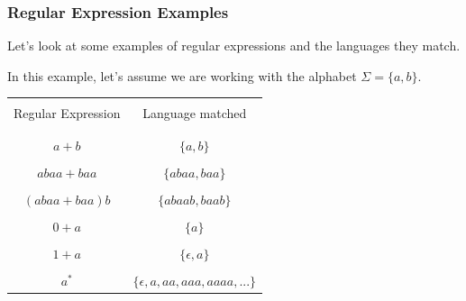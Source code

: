 \documentclass[aspectratio=169]{beamer}
\begin{document}
\begin{frame}[fragile]
  \frametitle{Regular Expression Examples}

  Let's look at some examples of regular expressions and the languages they match.

  \vspace{\fill}

  In this example, let's assume we are working with the alphabet $\Sigma = \{a, b\}$.

  \pause
  \vspace{\fill}

  \begin{center}
    \begin{tabular}{c || c}
      \hline & \\[-1.5ex]
      Regular Expression & Language matched \\ [2pt]
      \hline & \\[-2ex]
      \hline & \\[-1.5ex]
      $a + b$ & $\{a, b\}$ \\ [2pt]
      \hline & \\[-1.5ex]
      $abaa + baa$ & $\{abaa, baa\}$ \\ [2pt]
      \hline & \\[-1.5ex]
      $(abaa + baa)b$ & $\{ abaab, baab \}$ \\ [2pt]
      \hline & \\[-1.5ex]
      $0 + a$ & $\{a\}$ \\ [2pt]
      \hline & \\[-1.5ex]
      $1 + a$ & $\{ \epsilon, a \}$ \\ [2pt]
      \hline & \\[-1.5ex]
      $a^*$ & $\{ \epsilon, a, aa, aaa, aaaa, ... \}$ \\ [2pt]
      \hline
    \end{tabular}
  \end{center}
\end{frame}
\end{document}
